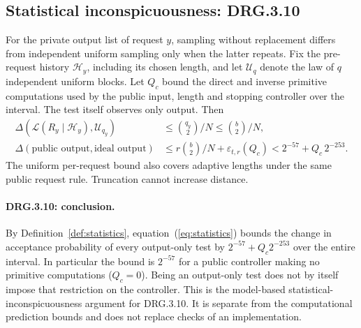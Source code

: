 \documentclass[journal=tosc,preprint,floatrow,nohyperxmp]{iacrtrans}
\newif\ifjordireview
\newcounter{jordinote}
\newcommand{\jordinote}[2]{%
  \ifjordireview
  \stepcounter{jordinote}\par\medskip\noindent
  \fcolorbox{blue!55!black}{blue!4}{%
    \begin{minipage}{\dimexpr\linewidth-2\fboxsep-2\fboxrule\relax}
    \small\raggedright\color{blue!45!black}
    \textbf{Solo Jordi -- J\thejordinote: #1}\par\smallskip
    #2
    \end{minipage}}\par\medskip
  \fi
}
\numberwithin{lemma}{section}
\numberwithin{proposition}{section}
\numberwithin{equation}{section}
\theoremstyle{definition}
\numberwithin{definition}{section}
\theoremstyle{plain}
\begin{document}
\subsection{Statistical inconspicuousness: DRG.3.10}
For the private output list of request $y$, sampling without replacement differs from independent uniform sampling only when the latter repeats. Fix the pre-request history $\mathcal H_y$, including its chosen length, and let $\mathcal U_q$ denote the law of $q$ independent uniform blocks. Let $Q_c$ bound the direct and inverse primitive computations used by the public input, length and stopping controller over the interval. The test itself observes only output. Then
\begin{align}
 \Delta(\mathcal L(R_y\mid\mathcal H_y),\mathcal U_{q_y})
 &\le\binom{q_y}{2}/N\le\binom b2/N,\\
 \Delta(\text{public output},\text{ideal output})
 &\le r\binom b2/N+\varepsilon_{t,r}(Q_c)<2^{-57}+Q_c\,2^{-253}.
 \label{eq:statistics}
\end{align}
The uniform per-request bound also covers adaptive lengths under the same public request rule. Truncation cannot increase distance.

\paragraph{DRG.3.10: conclusion.}
By Definition~\ref{def:statistics}, equation~(\ref{eq:statistics}) bounds the change in acceptance probability of every output-only test by $2^{-57}+Q_c2^{-253}$ over the entire interval. In particular the bound is $2^{-57}$ for a public controller making no primitive computations ($Q_c=0$). Being an output-only test does not by itself impose that restriction on the controller. This is the model-based statistical-inconspicuousness argument for DRG.3.10. It is separate from the computational prediction bounds and does not replace checks of an implementation.

\jordinote{La precisión sobre el controlador en .10}{No confundas un test que solo mira salida con un controlador que no calcula AES. Si el controlador hace $Q_c$ computaciones, ese presupuesto aparece en el error de comparación; el número $2^{-57}$ aislado exige $Q_c=0$. Revisa también que la cota estadística de un intervalo no se presente como fuerza de predicción de 57 bits. Esta distinción corrige una sobreafirmación anterior.}

\end{document}
